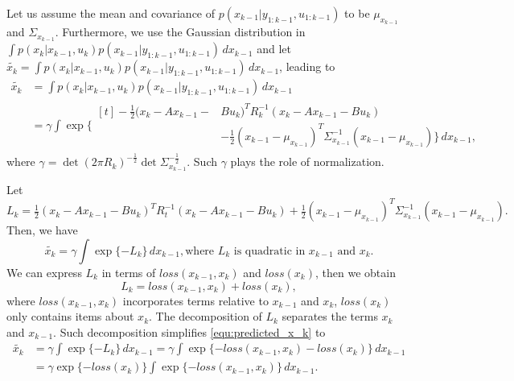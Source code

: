 Let us assume the mean and covariance of $p(x_{k-1}|y_{1:k-1},u_{1:k-1})$ to be $\mu_{x_{k-1}}$ and $\Sigma_{x_{k-1}}$.
Furthermore, we use the Gaussian distribution in $\int p(x_k|x_{k-1},u_{k})p(x_{k-1}|y_{1:k-1},u_{1:k-1}) \,dx_{k-1}$ and let $\tilde{x_{k}}=\int p(x_k|x_{k-1},u_{k})p(x_{k-1}|y_{1:k-1},u_{1:k-1}) \,dx_{k-1}$, leading to
\begin{equation} \label{equ:tilde_x}
	\begin{split}
		\tilde{x_{k}} &=\int p(x_k|x_{k-1},u_{k})p(x_{k-1}|y_{1:k-1},u_{1:k-1}) \,dx_{k-1}\\
		&= \gamma \int \exp \! \{
		\begin{aligned}[t]
			 -\frac{1}{2}({x}_k - Ax_{k-1}-&Bu_k)^TR_k^{-1}({x}_k - Ax_{k-1}-Bu_k)\\
			 & -\frac{1}{2}(x_{k-1} -\mu_{x_{k-1}})^T \Sigma_{x_{k-1}}^{-1}(x_{k-1} -\mu_{x_{k-1}})  \}\,dx_{k-1},
		\end{aligned}
	\end{split}
\end{equation}
where $\gamma = \det (2\pi R_k)^{-\frac{1}{2}}\det \Sigma_{x_{k-1}}^{-\frac{1}{2}}$. 
Such $\gamma$ plays the role of normalization. 

Let 
$
	L_k = \frac{1}{2}({x}_k - Ax_{k-1}-Bu_k)^TR_t^{-1}({x}_k - Ax_{k-1}-Bu_k) + \frac{1}{2}(x_{k-1} -\mu_{x_{k-1}})^T  \Sigma_{x_{k-1}}^{-1}(x_{k-1} -\mu_{x_{k-1}}).
$
Then, we have
\begin{equation} \label{equ:predicted_x_k}
	\tilde{x_{k}} =\gamma \int \exp\{-L_k\} \,dx_{k-1}, 
\text{where $L_k$ is quadratic in $x_{k-1}$ and $x_{k}$.}
\end{equation}
We can express $L_k$ in terms of $loss(x_{k-1},x_k)$ and $loss(x_k)$, then we obtain
\begin{equation} \label{equ:L_k}
	L_k = loss(x_{k-1},x_k) + loss(x_k),
\end{equation}
where $loss(x_{k-1},x_k)$ incorporates terms relative to $x_{k-1}$ and $x_k$, $loss(x_k)$ only contains items about $x_k$. 
The decomposition of $L_k$ separates the terms $x_k$ and $x_{k-1}$. 
Such decomposition simplifies \cref{equ:predicted_x_k} to 
\begin{equation} \label{equ:bel_xk_predicted}
	\begin{aligned}
		\tilde{x_{k}} &=\gamma \int \exp\{-L_k\} \,dx_{k-1} =\gamma \int \exp\{-loss(x_{k-1},x_k) - loss(x_k)\} \,dx_{k-1}\\
		&=\gamma \exp\{-loss(x_k)\}  \int \exp\{-loss(x_{k-1},x_k) \} \,dx_{k-1}.
	\end{aligned}
\end{equation}


